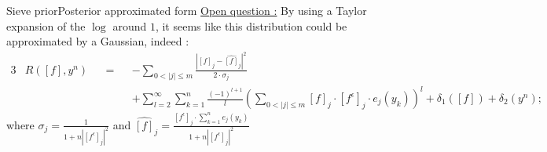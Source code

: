 \documentclass[10pt]{beamer}
\begin{document}

\begin{frame}{Sieve prior}{Posterior approximated form}
\underline{Open question :}
By using a Taylor expansion of the $\log$ around $1$, it seems like this distribution could be approximated by a Gaussian, indeed :
\begin{alignat*}{3}
& R\left(\left[f\right], y^{n}\right) &&=&& -\sum\limits_{0 < \vert j \vert \leq m}\frac{ \left\vert \left[ f \right]_{j} - \widehat{\left[ f \right]}_{j} \right\vert^{2}}{2 \cdot \sigma_{j}}\\
& && && + \sum\limits_{l = 2}^{\infty}\sum\limits_{k=1}^{n} \frac{(-1)^{l+1}}{l} \left(\sum\limits_{0 < \vert j \vert \leq m} \left[ f \right]_{j} \cdot \left[ f^{\epsilon} \right]_{j} \cdot e_{j}(y_{k})\right)^{l} + \delta_{1}\left(\left[f\right]\right) + \delta_{2}\left(y^{n}\right) ;
\end{alignat*}
where $\sigma_{j} = \frac{1}{1 + n \left\vert\left[f^{\epsilon}\right]_{j}\right\vert^{2}}$ and $\widehat{\left[f\right]}_{j} = \frac{\left[f^{\epsilon}\right]_{j} \cdot \sum\limits_{k = 1}^{n}e_{j}(y_{k})}{1 + n \left\vert\left[f^{\epsilon}\right]_{j}\right\vert^{2}}$
\end{frame}
\end{document}
